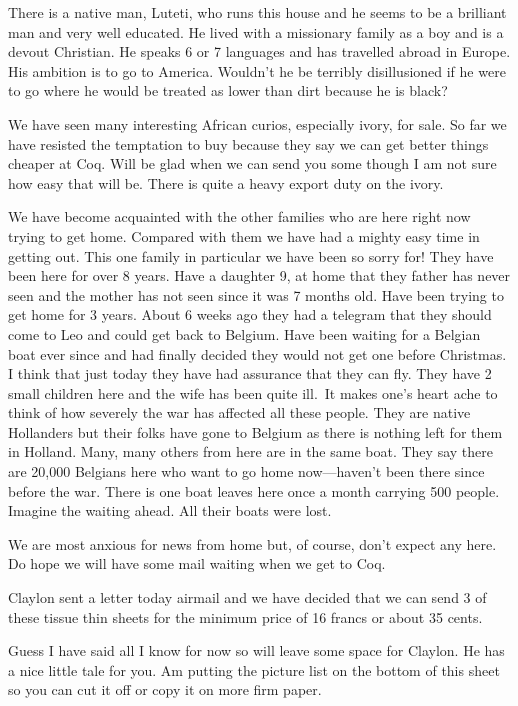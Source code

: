 \documentclass[
]{book}
\begin{document}
There is a native man, Luteti, who runs this house and he seems to be a brilliant man and very well educated. He lived with a missionary family as a boy and is a devout Christian. He speaks 6 or 7 languages and has travelled abroad in Europe. His ambition is to go to America. Wouldn't he be terribly disillusioned if he were to go where he would be treated as lower than dirt because he is black?

We have seen many interesting African curios, especially ivory, for sale. So far we have resisted the temptation to buy because they say we can get better things cheaper at Coq. Will be glad when we can send you some though I am not sure how easy that will be. There is quite a heavy export duty on the ivory.

We have become acquainted with the other families who are here right now trying to get home. Compared with them we have had a mighty easy time in getting out. This one family in particular we have been so sorry for! They have been here for over 8 years. Have a daughter 9, at home that they father has never seen and the mother has not seen since it was 7 months old. Have been trying to get home for 3 years. About 6 weeks ago they had a telegram that they should come to Leo and could get back to Belgium. Have been waiting for a Belgian boat ever since and had finally decided they would not get one before Christmas. I think that just today they have had assurance that they can fly. They have 2 small children here and the wife has been quite ill.~It makes one's heart ache to think of how severely the war has affected all these people. They are native Hollanders but their folks have gone to Belgium as there is nothing left for them in Holland. Many, many others from here are in the same boat. They say there are 20,000 Belgians here who want to go home now---haven't been there since before the war. There is one boat leaves here once a month carrying 500 people. Imagine the waiting ahead. All their boats were lost.

We are most anxious for news from home but, of course, don't expect any here. Do hope we will have some mail waiting when we get to Coq.

Claylon sent a letter today airmail and we have decided that we can send 3 of these tissue thin sheets for the minimum price of 16 francs or about 35 cents.

Guess I have said all I know for now so will leave some space for Claylon. He has a nice little tale for you. Am putting the picture list on the bottom of this sheet so you can cut it off or copy it on more firm paper.
\end{document}
